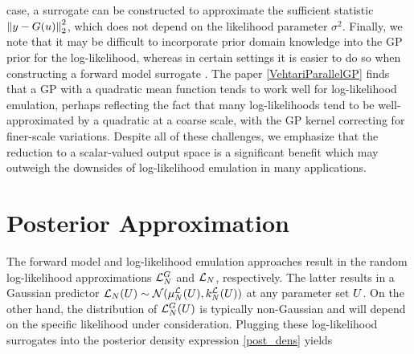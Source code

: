 \documentclass[12pt]{article}
\begin{document}
case, a surrogate can be constructed to approximate the sufficient statistic $\norm{\obs - \fwd(\Par)}_2^2$, 
which does not depend on the likelihood parameter $\sigma^2$. 
Finally, we note that it may be difficult to incorporate prior domain knowledge 
into the GP prior for the log-likelihood, whereas in certain settings it is easier to do so when constructing a forward model 
surrogate \cite{GP_PDE_priors}. The paper \ref{VehtariParallelGP} finds that a GP with a quadratic mean function tends to 
work well for log-likelihood emulation, perhaps reflecting the fact that many log-likelihoods tend to be well-approximated by 
a quadratic at a coarse scale, with the GP kernel correcting for finer-scale variations. 
Despite all of these challenges, we emphasize that the reduction to a scalar-valued output space is a significant benefit which 
may outweigh the downsides of log-likelihood emulation in many applications. 

\section{Posterior Approximation}
The forward model and log-likelihood emulation approaches result in the random log-likelihood approximations 
$\llikEmFwd[\Ndesign]$ and $\llikEm[\Ndesign]$, respectively. The latter results in a Gaussian predictor 
$\llikEm[\Ndesign](\parMat) \sim \Gaussian(\emMean[\Ndesign]{\llik}(\parMat), \emKer[\Ndesign]{\llik}(\parMat))$ 
at any parameter set $\parMat$. On the other hand, the distribution of $\llikEmFwd[\Ndesign](\parMat)$ is 
typically non-Gaussian and will depend on the specific likelihood under consideration.
Plugging these log-likelihood surrogates into the posterior density expression \ref{post_dens} yields
\end{document}

